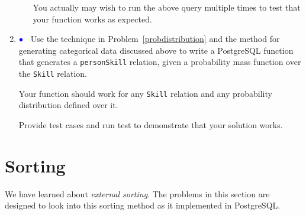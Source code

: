 \documentclass{article}
\newcommand{\bluebullet}{$\textcolor{blue}{\bullet}$}
\begin{document}
\begin{enumerate}[resume]
\begin{enumerate}
You actually may wish to run the above query multiple times to test that
your function works as expected.

\end{enumerate}


\item \bluebullet\ %
Use the technique in Problem~\ref{probdistribution} and the method for generating categorical data discussed above to
write a PostgreSQL function that generates a {\tt personSkill} relation, given a probability mass function over the {\tt Skill} relation.   

Your function should work for any {\tt Skill} relation and any probability distribution defined over it.

Provide test cases and run test to demonstrate that your solution works.  

\end{enumerate}




\newpage
\section{Sorting}

We have learned about \emph{external sorting}.   The problems in this section are designed to look into this sorting method as it implemented in PostgreSQL.
\end{document}
